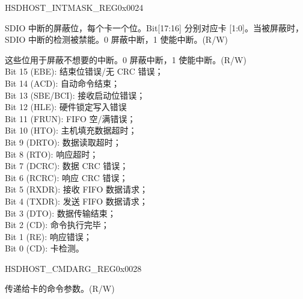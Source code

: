 \begin{register}{H}{SDHOST\_INTMASK\_REG}{0x{}0024}\label{regdesc:INTMASKREG}
%
%
%
\regnewline%
\begin{regdesc}\begin{reglist}
\item [SDHOST\_SDIO\_INT\_MASK]SDIO 中断的屏蔽位，每个卡一个位。Bit[17:16] 分别对应卡 [1:0]。当被屏蔽时，SDIO 中断的检测被禁能。0 屏蔽中断，1 使能中断。(R/W)
\item [SDHOST\_INT\_MASK] 这些位用于屏蔽不想要的中断。0 屏蔽中断，1 使能中断。(R/W)\\
Bit 15 (EBE): 结束位错误/无 CRC 错误；\\
Bit 14 (ACD): 自动命令结束；\\
Bit 13 (SBE/BCI): 接收启动位错误；\\
Bit 12 (HLE): 硬件锁定写入错误\\
Bit 11 (FRUN): FIFO 空/满错误；\\
Bit 10 (HTO): 主机填充数据超时；\\
Bit 9 (DRTO): 数据读取超时；\\
Bit 8 (RTO): 响应超时； \\
Bit 7 (DCRC): 数据 CRC 错误； \\
Bit 6 (RCRC): 响应 CRC 错误； \\
Bit 5 (RXDR): 接收 FIFO 数据请求； \\
Bit 4 (TXDR): 发送 FIFO 数据请求； \\
Bit 3 (DTO): 数据传输结束； \\
Bit 2 (CD): 命令执行完毕； \\
Bit 1 (RE): 响应错误；\\
Bit 0 (CD): 卡检测。
\end{reglist}\end{regdesc}
\end{register}


\begin{register}{H}{SDHOST\_CMDARG\_REG}{0x{}0028}\label{regdesc:CMDARGREG}
%
\regnewline%
\begin{regdesc}\begin{reglist}
\item [SDHOST\_CMDARG\_REG] 传递给卡的命令参数。(R/W)
\end{reglist}\end{regdesc}
\end{register}


